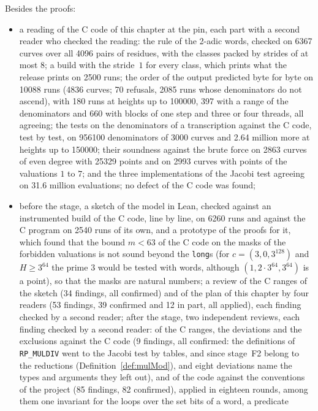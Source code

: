 Besides the proofs:
\begin{itemize}
  \item a reading of the C code of this chapter at the pin, each part with a second reader who
    checked the reading: the rule of the 2-adic words, checked on 6367 curves over all 4096 pairs of
    residues, with the classes packed by strides of at most $8$; a build with the stride~$1$ for
    every class, which prints what the release prints on 2500 runs; the order of the output
    predicted byte for byte on 10088 runs (4836 curves; 70 refusals, 2085 runs whose denominators do
    not ascend), with 180 runs at heights up to 100000, 397 with a range of the denominators and 660
    with blocks of one step and three or four threads, all agreeing; the tests on the denominators
    of a transcription against the C code, test by test, on 956100 denominators of 3000 curves and
    2.64 million more at heights up to 150000; their soundness against the brute force on 2863
    curves of even degree with 25329 points and on 2993 curves with points of the valuations $1$ to
    $7$; and the three implementations of the Jacobi test agreeing on 31.6 million evaluations; no
    defect of the C code was found;
  \item before the stage, a sketch of the model in Lean, checked against an instrumented build of
    the C code, line by line, on 6260 runs and against the C program on 2540 runs of its own, and a
    prototype of the proofs for it, which found that the bound $m < 63$ of the C code on the masks
    of the forbidden valuations is not sound beyond the \verb|long|s (for $c = (3, 0, 3^{128})$ and
    $H \ge 3^{64}$ the prime $3$ would be tested with words, although $(1, 2 \cdot 3^{64}, 3^{64})$
    is a point), so that the masks are natural numbers; a review of the C ranges of the sketch (34
    findings, all confirmed) and of the plan of this chapter by four readers (53 findings, 39
    confirmed and 12 in part, all applied), each finding checked by a second reader; after the
    stage, two independent reviews, each finding checked by a second reader: of the C ranges, the
    deviations and the exclusions against the C code (9 findings, all confirmed: the definitions of
    \verb|RP_MULDIV| went to the Jacobi test by tables, and since stage~F2 belong to the reductions
    (Definition~\ref{def:mulMod}), and eight deviations name the types and arguments they left out),
    and of the code against the conventions of the project (85 findings, 82 confirmed), applied in
    eighteen rounds, among them one invariant for the loops over the set bits of a word, a predicate

\end{itemize}
